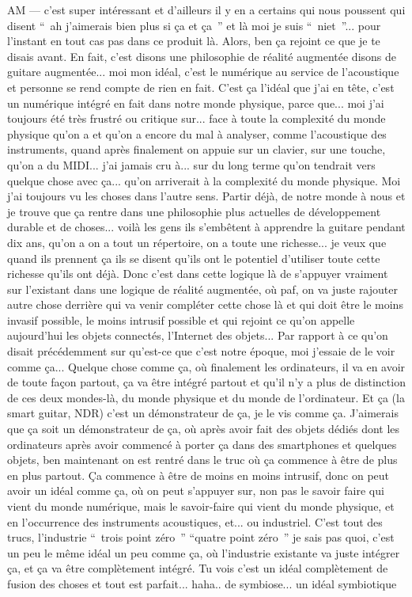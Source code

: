 AM — c'est super intéressant et d'ailleurs il y en a certains qui nous poussent qui disent “ ah j'aimerais bien plus si ça et ça ” et là moi je suis “ niet ”... pour l'instant en tout cas pas dans ce produit là. Alors, ben ça rejoint ce que je te disais avant. En fait, c'est disons une philosophie de réalité augmentée disons de guitare augmentée... moi mon idéal, c'est le numérique au service de l'acoustique et personne se rend compte de rien en fait. C'est ça l'idéal que j'ai en tête, c'est un numérique intégré en fait dans notre monde physique, parce que... moi j'ai toujours été très frustré ou critique sur... face à toute la complexité du monde physique qu'on a et qu'on a encore du mal à analyser, comme l'acoustique des instruments, quand après finalement on appuie sur un clavier, sur une touche, qu'on a du MIDI... j'ai jamais cru à... sur du long terme qu'on tendrait vers quelque chose avec ça... qu'on arriverait à la complexité du monde physique. Moi j'ai toujours vu les choses dans l'autre sens. Partir déjà, de notre monde à nous et je trouve que ça rentre dans une philosophie plus actuelles de développement durable et de choses... voilà les gens ils s'embêtent à apprendre la guitare pendant dix ans, qu'on a on a tout un répertoire, on a toute une richesse... je veux que quand ils prennent ça ils se disent qu'ils ont le potentiel d'utiliser toute cette richesse qu'ils ont déjà. Donc c'est dans cette logique là de s'appuyer vraiment sur l'existant dans une logique de réalité augmentée, où paf, on va juste rajouter autre chose derrière qui va venir compléter cette chose là et qui doit être le moins invasif possible, le moins intrusif possible et qui rejoint ce qu'on appelle aujourd'hui les objets connectés, l'Internet des objets... Par rapport à ce qu'on disait précédemment sur qu'est-ce que c'est notre époque, moi j'essaie de le voir comme ça... Quelque chose comme ça, où finalement les ordinateurs, il va en avoir de toute façon partout, ça va être intégré partout et qu'il n'y a plus de distinction de ces deux mondes-là, du monde physique et du monde de l'ordinateur. Et ça (la smart guitar, NDR) c'est un démonstrateur de ça, je le vis comme ça. J'aimerais que ça soit un démonstrateur de ça, où après avoir fait des objets dédiés dont les ordinateurs après avoir commencé à porter ça dans des smartphones et quelques objets, ben maintenant on est rentré dans le truc où ça commence à être de plus en plus partout. Ça commence à être de moins en moins intrusif, donc on peut avoir un idéal comme ça, où on peut s'appuyer sur, non pas le savoir faire qui vient du monde numérique, mais le savoir-faire qui vient du monde physique, et en l'occurrence des instruments acoustiques, et... ou industriel. C'est tout des trucs, l'industrie “ trois point zéro ”  “quatre point zéro ” je sais pas quoi, c'est un peu le même idéal un peu comme ça, où l'industrie existante va juste intégrer ça, et ça va être complètement intégré. Tu vois c'est un idéal complètement de fusion des choses et tout est parfait... haha.. de symbiose... un idéal symbiotique

